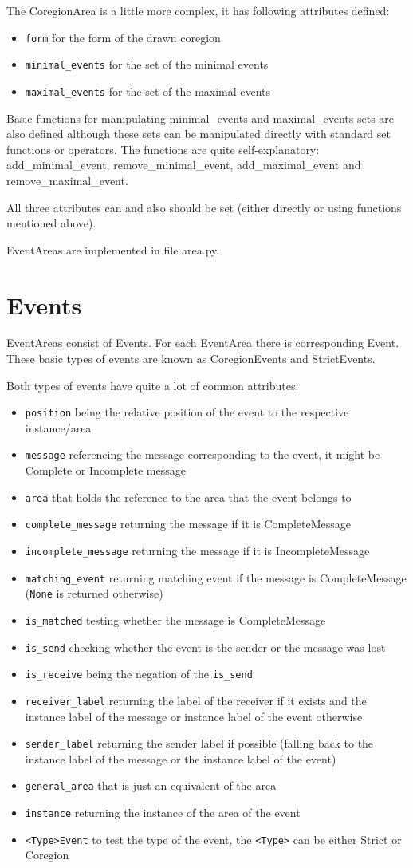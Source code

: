 \documentclass[11pt,oneside]{fithesis2}
\newcommand{\T}[1]{\texttt{#1}}
\newcommand{\ite}[1]{\item{\texttt{#1}}}
\begin{document}
The CoregionArea is a little more complex, it has following attributes defined:
\begin{itemize}
\ite{form} for the form of the drawn coregion
\ite{minimal\_events} for the set of the minimal events
\ite{maximal\_events} for the set of the maximal events
\end{itemize}

Basic functions for manipulating minimal\_events and maximal\_events sets are also defined although these sets can be manipulated directly with standard set functions or operators. The functions are quite self-explanatory: add\_minimal\_event, remove\_minimal\_event, add\_maximal\_event and remove\_maximal\_event.

All three attributes can and also should be set (either directly or using functions mentioned above).

EventAreas are implemented in file area.py.


\section{Events}
EventAreas consist of  Events. For each EventArea there is corresponding Event. These basic types of events are known as CoregionEvents and StrictEvents.

Both types of events have quite a lot of common attributes:
\begin{itemize}
\ite{position} being the relative position of the event to the respective instance/area
\ite{message} referencing the message corresponding to the event, it might be Complete or Incomplete message
\ite{area} that holds the reference to the area that the event belongs to
\ite{complete\_message} returning the message if it is CompleteMessage
\ite{incomplete\_message} returning the message if it is IncompleteMessage
\ite{matching\_event} returning matching event if the message is CompleteMessage (\T{None} is returned otherwise)
\ite{is\_matched} testing whether the message is CompleteMessage
\ite{is\_send} checking whether the event is the sender or the message was lost
\ite{is\_receive} being the negation of the \T{is\_send}
\ite{receiver\_label} returning the label of the receiver if it exists and the instance label of the message or instance label of the event otherwise
\ite{sender\_label} returning the sender label if possible (falling back to the instance label of the message or the instance label of the event)
\ite{general\_area} that is just an equivalent of the area
\ite{instance} returning the instance of the area of the event
\ite{<Type>Event} to test the type of the event, the \T{<Type>} can be either Strict or Coregion
\end{itemize}
\end{document}
